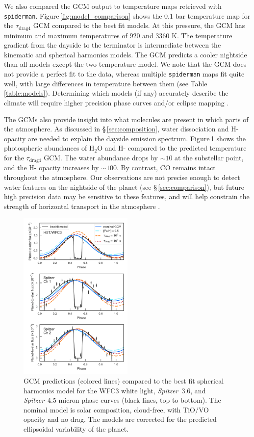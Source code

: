 \documentclass[twocolumn]{aastex61}
\newcommand{\project}[1]{\textsl{#1}}
\newcommand{\Spitzer}{\project{Spitzer}}
\begin{document}
We also compared the GCM output to temperature maps retrieved with \texttt{spiderman}. Figure\,\ref{fig:model_comparison} shows the 0.1 bar temperature map for the $\tau_\mathrm{drag4}$ GCM compared to the best fit models. At this pressure, the GCM has minimum and maximum temperatures of $920$ and $3360$ K. The temperature gradient from the dayside to the terminator is intermediate between the kinematic and spherical harmonics models. The GCM predicts a cooler nightside than all models except the two-temperature model. We note that the GCM does not provide a perfect fit to the data, whereas multiple \texttt{spiderman} maps fit quite well, with large differences in temperature between them (see Table \,\ref{table:models}). Determining which models (if any) accurately describe the climate will require higher precision phase curves and/or eclipse mapping \citep[e.g.][]{dewit12}. 

The GCMs also provide insight into what molecules are present in which parts of the atmosphere. As discussed in \S\,\ref{sec:composition}, water dissociation and H- opacity are needed to explain the dayside emission spectrum. Figure\,\ref{fig:gcmcomparison} shows the photospheric abundances of H$_2$O and H- compared to the predicted temperature for the $\tau_\mathrm{drag4}$ GCM. The water abundance drops by $\sim10$ at the substellar point, and the H- opacity increases by $\sim100$.  By contrast, CO remains intact throughout the atmosphere.  Our observations are not precise enough to detect water features on the nightside of the planet (see \S\,\ref{sec:comparison}), but future high precision data may be sensitive to these features, and will help constrain the strength of horizontal transport in the atmosphere \citep{agundez14}.

\begin{figure}
\includegraphics[width = 0.5\textwidth]{fig14.pdf}
\caption{GCM predictions (colored lines) compared to the best fit spherical harmonics model for the WFC3 white light, \Spitzer\ 3.6, and \Spitzer\ 4.5 micron phase curves (black lines, top to bottom). The nominal model is solar composition, cloud-free, with TiO/VO opacity and no drag. The models are corrected for the predicted ellipsoidal variability of the planet.}
\label{fig:gcmcomparison}
\end{figure}
\end{document}
